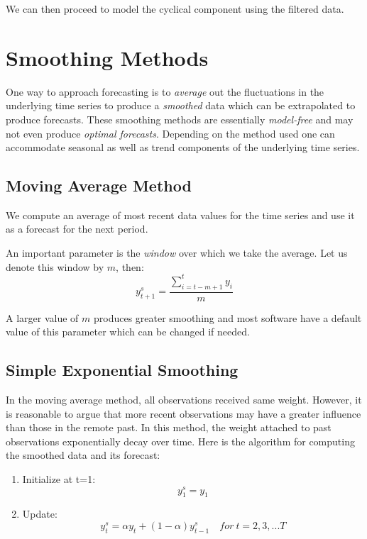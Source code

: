 \documentclass[]{book}
\theoremstyle{definition}
\theoremstyle{definition}
\theoremstyle{definition}
\theoremstyle{remark}
\begin{document}
We can then proceed to model the cyclical component using the filtered data.

\hypertarget{smoothing-methods}{%
\chapter{Smoothing Methods}\label{smoothing-methods}}

One way to approach forecasting is to \emph{average} out the fluctuations in the underlying time series to produce a \emph{smoothed} data which can be extrapolated to produce forecasts. These smoothing methods are essentially \emph{model-free} and may not even produce \emph{optimal forecasts}. Depending on the method used one can accommodate seasonal as well as trend components of the underlying time series.

\hypertarget{moving-average-method}{%
\section{Moving Average Method}\label{moving-average-method}}

We compute an average of most recent data values for the time series and use it as a forecast for the next period.

An important parameter is the \emph{window} over which we take the average. Let us denote this window by \(m\), then:
\begin{equation}
    y^s_{t+1}=\frac{\sum \limits_{i=t-m+1}^{t}{y_i}}{m}
    \end{equation}

A larger value of \(m\) produces greater smoothing and most software have a default value of this parameter which can be changed if needed.

\hypertarget{simple-exponential-smoothing}{%
\section{Simple Exponential Smoothing}\label{simple-exponential-smoothing}}

In the moving average method, all observations received same weight. However, it is reasonable to argue that more recent observations may have a greater influence than those in the remote past. In this method, the weight attached to past observations exponentially decay over time. Here is the algorithm for computing the smoothed data and its forecast:

\begin{enumerate}
\def\labelenumi{\arabic{enumi}.}
\item
  Initialize at t=1:
  \[y_1^s=y_1\]
\item
  Update:
  \[y_{t}^{s}= \alpha y_t + (1-\alpha)y_{t-1}^{s}  \quad for \ t=2,3,...T\]
\end{enumerate}
\end{document}
